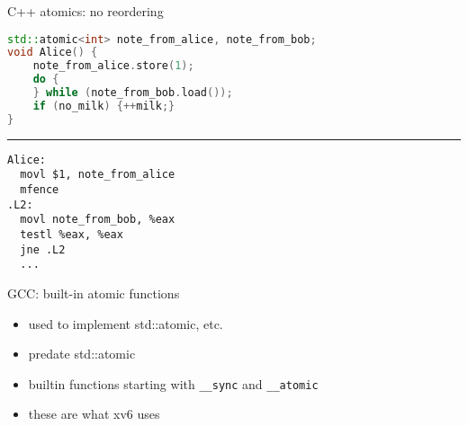\begin{frame}[fragile,label=prevReorderCpp2]{C++ atomics: no reordering}
\begin{lstlisting}[language=C++,style=smaller]
std::atomic<int> note_from_alice, note_from_bob;
void Alice() {
    note_from_alice.store(1);
    do {
    } while (note_from_bob.load());
    if (no_milk) {++milk;}
}
\end{lstlisting}
\hrule
\begin{lstlisting}[language=myasm,style=small,morekeywords=mfence]
Alice:
  movl $1, note_from_alice
  mfence
.L2:
  movl note_from_bob, %eax
  testl %eax, %eax
  jne .L2
  ...
\end{lstlisting}
\end{frame}
\begin{frame}{GCC: built-in atomic functions}
    \begin{itemize}
    \item used to implement std::atomic, etc.
    \item predate std::atomic
        \vspace{.5cm}
    \item builtin functions starting with \texttt{\_\_sync} and \texttt{\_\_atomic}
    \item these are what xv6 uses
    \end{itemize}
\end{frame}

